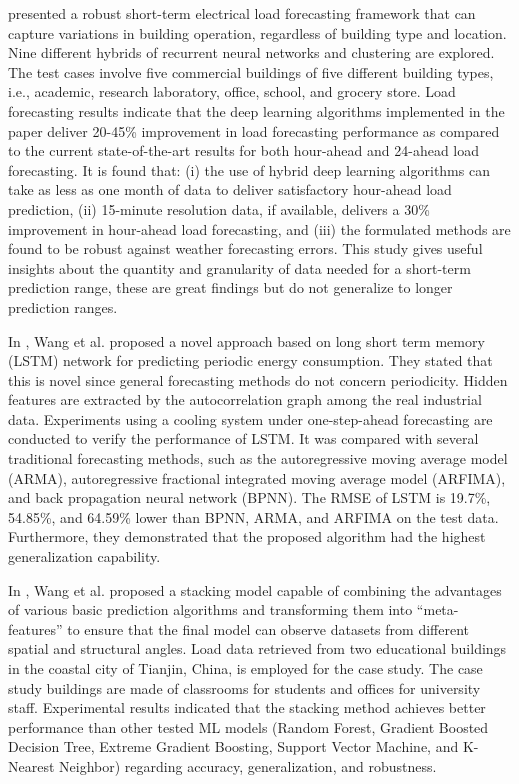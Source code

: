 \cite{CHITALIA2020115410} presented a robust short-term electrical load forecasting framework that can capture variations in building operation, regardless of building type and location.
Nine different hybrids of recurrent neural networks and clustering are explored.
The test cases involve five commercial buildings of five different building types, i.e., academic, research laboratory, office, school, and grocery store.
Load forecasting results indicate that the deep learning algorithms implemented in the paper deliver 20-45\% improvement in load forecasting performance as compared to the current state-of-the-art results for both hour-ahead and 24-ahead load forecasting.
It is found that:
(i) the use of hybrid deep learning algorithms can take as less as one month of data to deliver satisfactory hour-ahead load prediction,
(ii) 15-minute resolution data, if available, delivers a 30\% improvement in hour-ahead load forecasting,
and (iii) the formulated methods are found to be robust against weather forecasting errors.
This study gives useful insights about the quantity and granularity of data needed for a short-term prediction range, these are great findings but do not generalize to longer prediction ranges.

In \cite{WANG2020117197}, Wang et al. proposed a novel approach based on long short term memory (LSTM) network for predicting periodic energy consumption.
They stated that this is novel since general forecasting methods do not concern periodicity.
Hidden features are extracted by the autocorrelation graph among the real industrial data.
Experiments using a cooling system under one-step-ahead forecasting are conducted to verify the performance of LSTM.
It was compared with several traditional forecasting methods, such as the autoregressive moving average model (ARMA), autoregressive fractional integrated moving average model (ARFIMA), and back propagation neural network (BPNN).
The RMSE of LSTM is 19.7\%, 54.85\%, and 64.59\% lower than BPNN, ARMA, and ARFIMA on the test data.
Furthermore, they demonstrated that the proposed algorithm had the highest generalization capability.

In \cite{WANG2020114561}, Wang et al. proposed a stacking model capable of combining the advantages of various basic prediction algorithms and transforming them into “meta-features” to ensure that the final model can observe datasets from different spatial and structural angles.
Load data retrieved from two educational buildings in the coastal city of Tianjin, China, is employed for the case study.
The case study buildings are made of classrooms for students and offices for university staff.
Experimental results indicated that the stacking method achieves better performance than other tested ML models (Random Forest, Gradient Boosted Decision Tree, Extreme Gradient Boosting, Support Vector Machine, and K-Nearest Neighbor) regarding accuracy, generalization, and robustness.

